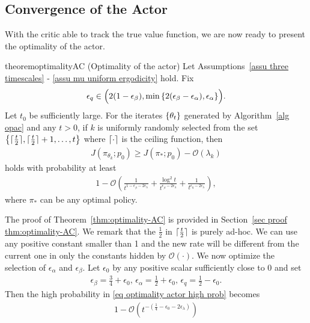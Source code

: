 \documentclass[twoside,11pt]{article}
\DeclarePairedDelimiter{\ceil}{\lceil}{\rceil}
\newcommand{\fO}{\mathcal{O}}
\numberwithin{assucounter}{section}
\begin{document}
\subsection{Convergence of the Actor}
With the critic able to track the true value function,
we are now ready to present the optimality of the actor.
\begin{restatable}{theorem}{optimalityAC}\label{thm:optimality-AC}
  (Optimality of the actor)
  Let Assumptions~\ref{assu three timescales} - \ref{assu mu uniform ergodicity} hold.
  Fix  
  \begin{align}
    \epsilon_q \in \Big(2(1-\epsilon_\beta), \min\qty{2(\epsilon_\beta - \epsilon_\alpha), \epsilon_\alpha}\Big).
  \end{align}
  Let $t_0$ be sufficiently large.
  For the iterates $\qty{\theta_t}$ generated by Algorithm~\ref{alg opac} and any $t > 0$,
  if $k$ is uniformly randomly selected from the set $\qty{\ceil{\frac{t}{2}}, \ceil{\frac{t}{2}} + 1, \dots, t}$ where $\ceil{\cdot}$ is the ceiling function,
  then 
  \begin{align}
    \label{eq optimality actor sub optimality}
    J(\pi_{\theta_k}; p_0) \geq J(\pi_*; p_0) - \fO\left(\lambda_k \right)
  \end{align}
  holds with probability at least
  \begin{align}
    \label{eq optimality actor high prob}
    1 - \fO\left(\frac{1}{t^{1-\epsilon_\beta - 2\epsilon_\lambda}} + \frac{\log^2 t}{t^{\epsilon_\beta- 2\epsilon_\lambda}} + \frac{1}{t^{\epsilon_q- 2\epsilon_\lambda }}\right),
  \end{align}
  where $\pi_*$ can be any optimal policy.
\end{restatable}
\noindent The proof of Theorem~\ref{thm:optimality-AC} is provided in Section~\ref{sec proof thm:optimality-AC}.
We remark that the $\frac{1}{2}$ in $\ceil{\frac{t}{2}}$ is purely ad-hoc.
We can use any positive constant smaller than 1 and the new rate will be different from the current one in only the constants hidden by $\fO(\cdot)$.
We now optimize the selection of $\epsilon_\alpha$ and $\epsilon_\beta$.
Let $\epsilon_0$ by any positive scalar sufficiently close to 0
and set
\begin{align}
  \label{eq optimal lr}
  \epsilon_\beta = \frac{3}{4} + \epsilon_0, \,\epsilon_\alpha = \frac{1}{2} + \epsilon_0, \,
  \epsilon_q = \frac{1}{2} - \epsilon_0.
\end{align}
Then the high probability in \eqref{eq optimality actor high prob} becomes
\begin{align}
  1 - \fO\left(t^{-\left(\frac{1}{4} - \epsilon_0 - 2\epsilon_\lambda \right)}\right)
\end{align}
\end{document}
